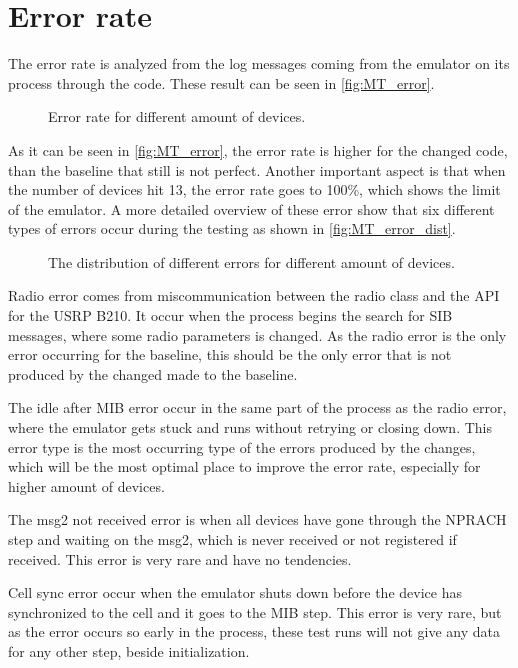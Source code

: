 \section{Error rate}
\label{sec:MTerror}
The error rate is analyzed from the log messages coming from the emulator on its process through the code. These result can be seen in \autoref{fig:MT_error}.

\begin{figure}[H]
\centering
\resizebox{0.5\textwidth}{!}{
}
\caption{Error rate for different amount of devices.}
\label{fig:MT_error}
\end{figure}

As it can be seen in \autoref{fig:MT_error}, the error rate is higher for the changed code, than the baseline that still is not perfect. Another important aspect is that when the number of devices hit 13, the error rate goes to 100\%, which shows the limit of the emulator. A more detailed overview of these error show that six different types of errors occur during the testing as shown in \autoref{fig:MT_error_dist}.

\begin{figure}[H]
\centering
\resizebox{0.9\textwidth}{!}{
}
\caption{The distribution of different errors for different amount of devices.}
\label{fig:MT_error_dist}
\end{figure}

Radio error comes from miscommunication between the radio class and the API for the USRP B210. It occur when the process begins the search for  SIB messages, where some radio parameters is changed. As the radio error is the only error occurring for the baseline, this should be the only error that is not produced by the changed made to the baseline.

The idle after MIB error occur in the same part of the process as the radio error, where the emulator gets stuck and runs without retrying or closing down. This error type is the most occurring type of the errors produced by the changes, which will be the most optimal place to improve the error rate, especially for higher amount of devices.

The msg2 not received error is when all devices have gone through the NPRACH step and waiting on the msg2, which is never received or not registered if received. This error is very rare and have no tendencies.

Cell sync error occur when the emulator shuts down before the device has synchronized to the cell and it goes to the MIB step. This error is very rare, but as the error occurs so early in the process, these test runs will not give any data for any other step, beside initialization.

